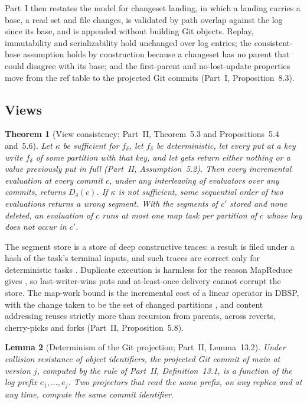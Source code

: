 \documentclass[11pt,letterpaper]{article}
\newtheorem{theorem}{Theorem}[section]
\newtheorem{lemma}[theorem]{Lemma}
\theoremstyle{definition}
\theoremstyle{remark}
\begin{document}
Part~I then restates the model for changeset landing, in which a landing carries a base, a read set and file changes, is validated by path overlap against the log since its base, and is appended without building Git objects. Replay, immutability and serializability hold unchanged over log entries; the consistent-base assumption holds by construction because a changeset has no parent that could disagree with its base; and the first-parent and no-lost-update properties move from the ref table to the projected Git commits (Part~I, Proposition~8.3).

\subsection{Views}

\begin{theorem}[View consistency; Part~II, Theorem~5.3 and Propositions~5.4 and~5.6]
\label{thm:syn:views}
Let $\kappa$ be sufficient for $f_\delta$, let $f_\delta$ be deterministic, let every put at a key write $f_\delta$ of some partition with that key, and let gets return either nothing or a value previously put in full (Part~II, Assumption~5.2). Then every incremental evaluation at every commit $c$, under any interleaving of evaluators over any commits, returns $D_\delta(c)$. If $\kappa$ is not sufficient, some sequential order of two evaluations returns a wrong segment. With the segments of $c'$ stored and none deleted, an evaluation of $c$ runs at most one map task per partition of $c$ whose key does not occur in $c'$.
\end{theorem}

The segment store is a store of deep constructive traces: a result is filed under a hash of the task's terminal inputs, and such traces are correct only for deterministic tasks \cite{mokhov2018build}. Duplicate execution is harmless for the reason MapReduce gives \cite{dean2004mapreduce}, so last-writer-wins puts and at-least-once delivery cannot corrupt the store. The map-work bound is the incremental cost of a linear operator in DBSP, with the change taken to be the set of changed partitions \cite{budiu2023dbsp}, and content addressing reuses strictly more than recursion from parents, across reverts, cherry-picks and forks (Part~II, Proposition~5.8).

\begin{lemma}[Determinism of the Git projection; Part~II, Lemma~13.2]
\label{lem:syn:projection}
Under collision resistance of object identifiers, the projected Git commit of main at version $j$, computed by the rule of Part~II, Definition~13.1, is a function of the log prefix $e_1,\dots,e_j$. Two projectors that read the same prefix, on any replica and at any time, compute the same commit identifier.
\end{lemma}
\end{document}
